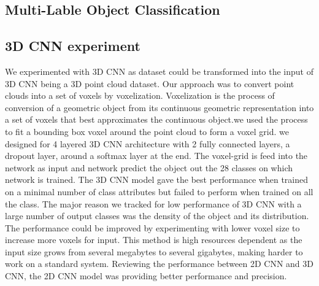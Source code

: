 
\subsection{Multi-Lable Object Classification}




\subsection{3D CNN experiment}
We experimented with 3D CNN as dataset could be transformed into the
input of 3D CNN being a 3D point cloud dataset. Our approach was to convert point clouds into a set of voxels by voxelization. Voxelization is the process of conversion of a geometric object from its
continuous geometric representation into a set of voxels that best approximates the continuous object.we used the process to fit a bounding box voxel around the point cloud to form a voxel grid. we designed for 4 layered 3D CNN architecture with 2 fully connected layers, a dropout layer, around a softmax layer at the end. The voxel-grid is feed into the network as input and network predict the object out the 28 classes on which network is trained. The 3D CNN model gave the best performance when trained on a minimal number of class attributes but failed to perform when trained on all the class. The major reason we tracked for low performance of 3D CNN with a large number of output classes was the
density of the object and its distribution.
The performance could be improved by experimenting with lower voxel size to increase more voxels for input. This method is high resources dependent as the input size grows from several megabytes to several gigabytes, making harder to work on a standard system. Reviewing the performance between 2D CNN and 3D CNN, the 2D CNN model was providing better performance and precision.
